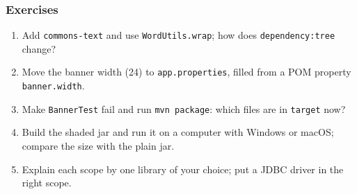 \documentclass[aspectratio=169,10pt,compress]{beamer}
\begin{document}
\begin{frame}[t,fragile] \frametitle{Exercises}
  \begin{enumerate}\small
    \item Add \texttt{commons-text} and use \texttt{WordUtils.wrap}; how does \texttt{dependency:tree} change?
    \item Move the banner width (24) to \texttt{app.properties}, filled from a POM property \texttt{banner.width}.
    \item Make \texttt{BannerTest} fail and run \texttt{mvn package}: which files are in \texttt{target} now?
    \item Build the shaded jar and run it on a computer with Windows or macOS; compare the size with the plain jar.
    \item Explain each scope by one library of your choice; put a JDBC driver in the right scope.
  \end{enumerate}
\end{frame}




\begin{frame}[t,fragile]
	\begin{center}
		\vspace{4cm}
	\end{center}
\end{frame}
\end{document}

